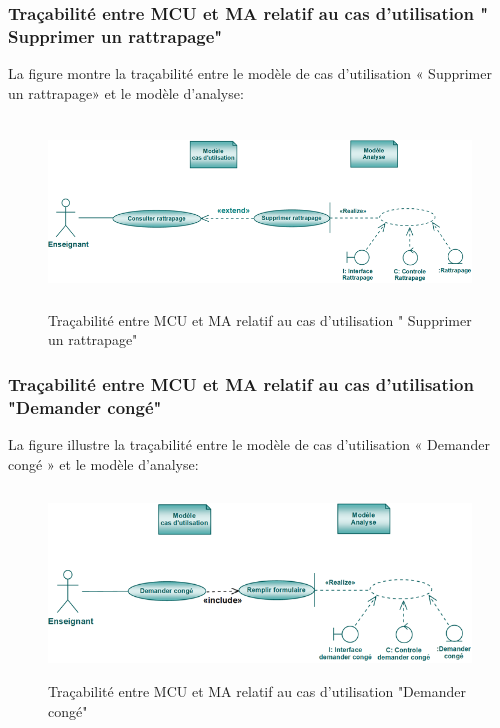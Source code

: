 \documentclass[12 pt ]{report}
\begin{document}
\subsubsection{Traçabilité entre MCU et MA relatif au cas d’utilisation " Supprimer un rattrapage" }
La figure  montre la traçabilité entre le modèle de cas d’utilisation « Supprimer un rattrapage» et le modèle d’analyse:

\begin{figure}[h]
\begin{center}
\includegraphics[width= 14cm , height =5cm]{tsr.PNG}
\caption{Traçabilité entre MCU et MA relatif au cas d’utilisation " Supprimer un rattrapage"}
\end{center}
\end{figure} 

\subsubsection{Traçabilité entre MCU et MA relatif au cas d’utilisation "Demander congé" }
La figure  illustre la traçabilité entre le modèle de cas d’utilisation « Demander congé » et le modèle d’analyse:
\begin{figure}[h]
\begin{center}
\includegraphics[width= 14cm , height =5cm]{tdcc.PNG}
\caption{Traçabilité entre MCU et MA relatif au cas d’utilisation "Demander congé"}
\end{center}
\end{figure}
\end{document}
